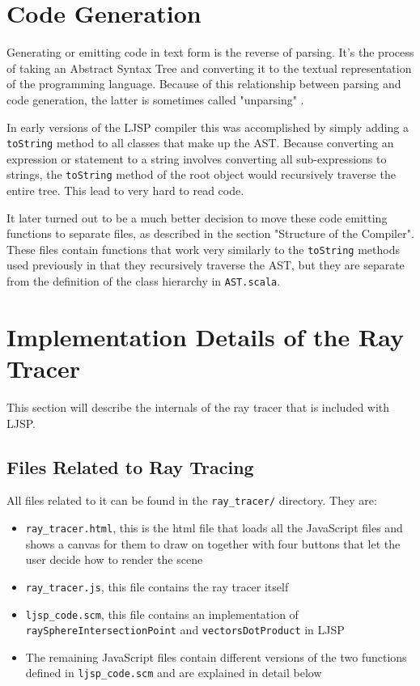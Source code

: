 \documentclass[11pt]{report}
\begin{document}


\section{Code Generation}
Generating or emitting code in text form is the reverse of parsing. It's the process of taking an Abstract Syntax Tree and converting it to the textual representation of the programming language. Because of this relationship between parsing and code generation, the latter is sometimes called "unparsing" \cite{nanopass}.

In early versions of the LJSP compiler this was accomplished by simply adding a \texttt{toString} method to all classes that make up the AST. Because converting an expression or statement to a string involves converting all sub-expressions to strings, the \texttt{toString} method of the root object would recursively traverse the entire tree. This lead to very hard to read code. 

It later turned out to be a much better decision to move these code emitting functions to separate files, as described in the section "Structure of the Compiler". These files contain functions that work very similarly to the \texttt{toString} methods used previously in that they recursively traverse the AST, but they are separate from the definition of the class hierarchy in \texttt{AST.scala}.

\section{Implementation Details of the Ray Tracer}
This section will describe the internals of the ray tracer that is included with LJSP.
\subsection{Files Related to Ray Tracing}
All files related to it can be found in the \texttt{ray_tracer/} directory. They are:
\begin{itemize}
\item \texttt{ray_tracer.html}, this is the html file that loads all the JavaScript files and shows a canvas for them to draw on together with four buttons that let the user decide how to render the scene
\item \texttt{ray_tracer.js}, this file contains the ray tracer itself
\item \texttt{ljsp_code.scm}, this file contains an implementation of \texttt{raySphereIntersectionPoint} and \texttt{vectorsDotProduct} in LJSP
\item The remaining JavaScript files contain different versions of the two functions defined in \texttt{ljsp_code.scm} and are explained in detail below
\end{itemize}
\end{document}
